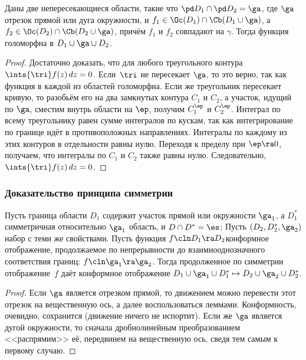 \documentclass[a4paper]{article}
\begin{document}
\begin{lemma}
Даны две непересекающиеся области, такие что $\pd D_1 \cap \pd D_2=\ga$, где $\ga$\т отрезок прямой
или дуга окружности, и  $f_1 \in \Oc(D_1) \cap \Cb(D_1 \cup \ga)$, а $f_2 \in \Oc(D_2) \cap \Cb(D_2 \cup\ga)$, причём $f_1$ и $f_2$ совпадают на $\gamma$.
Тогда функция
голоморфна в $D_1 \cup \ga \cup D_2$.
\end{lemma}
\begin{proof}
Достаточно доказать, что для любого треугольного
контура $\ints{\tri} f(z)\,dz=0$. Если~$\tri$ не
пересекает $\ga$, то это верно, так как функция в каждой из областей голоморфна.
Если же треугольник пересекает кривую, то разобьём его на два замкнутых контура $C_1$ и $C_2$, а
участок, идущий по $\ga$, сместим внутрь области на $\ep$, получим $C_1^\ep$ и $C_2^\ep$.
Интеграл по всему треугольнику равен сумме интегралов по кускам, так как интегрирование по границе
идёт в противоположных направлениях. Интегралы по каждому из этих контуров в отдельности равны нулю.
Переходя к пределу при $\ep\ra 0$, получаем, что интегралы по $C_1$ и $C_2$  также равны нулю. Следовательно,
$\ints{\tri}f(z)\,dz=0$.
\end{proof}

\subsubsection{Доказательство принципа симметрии}

\begin{theorem}
Пусть граница области $D_1$ содержит участок прямой или окружности $\ga_1$, а $D_1^*$\т
симметричная относительно $\ga_1$ область, и $D \cap D^*=\es$;
Пусть $(D_2, D_2^*,\ga_2)$\т набор с теми же свойствами. Пусть функция $f\cln D_1\ra D_2$\т конформное
отображение, продолжаемое по непрерывности до взаимно\д однозначного соответствия границ: $f\cln \ga_1 \ra \ga_2$.
Тогда продолженное по симметрии отображение~$f$ даёт конформное отображение
$D_1\cup\ga_1\cup D_1^* \mapsto D_2\cup\ga_2\cup D_2^*$.
\end{theorem}
\begin{proof}
Если $\ga$ является отрезком прямой, то движением можно перевести этот отрезок на вещественную ось, а далее воспользоваться
леммами. Конформность, очевидно, сохранится (движение ничего не испортит). Если же $\ga$ является дугой окружности, то
сначала дробно\д линейным преобразованием <<распрямим>> её, передвинем на вещественную ось, сведя тем самым к первому случаю.
\end{proof}
\end{document}
